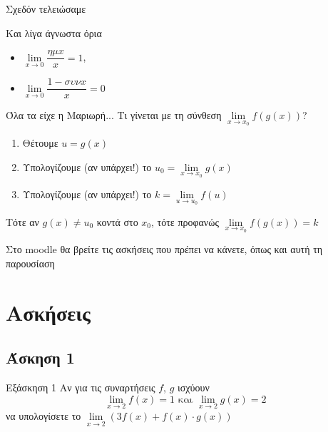 \documentclass[greek]{beamer}
\begin{document}
\begin{frame}{Σχεδόν τελειώσαμε}
  \begin{block}{Και λίγα άγνωστα όρια}
    \begin{itemize}
      \item $\lim\limits_{x \to 0}{ \dfrac{ημx}{x} }=1$, \pause
      \item $\lim\limits_{x \to 0}{ \dfrac{1-συνx}{x} }=0$
    \end{itemize}
  \end{block}
\end{frame}

\begin{frame}{Όλα τα είχε η Μαριωρή...}
  Τι γίνεται με τη σύνθεση  $\lim\limits_{x \to x_0}{ f(g(x))}$?
  \begin{enumerate}
    \item<1-> Θέτουμε $u=g(x)$
    \item<2-> Υπολογίζουμε (αν υπάρχει!) το $u_0=\lim\limits_{x \to x_0}{ g(x)}$
    \item<3-> Υπολογίζουμε (αν υπάρχει!) το $k=\lim\limits_{u \to u_0}{ f(u)}$
  \end{enumerate}
  Τότε αν $g(x)\ne u_0$ κοντά στο $x_0$, τότε προφανώς $\lim\limits_{x \to x_0}{ f(g(x))}=k$
\end{frame}

\begin{frame}
  Στο moodle θα βρείτε τις ασκήσεις που πρέπει να κάνετε, όπως και αυτή τη παρουσίαση
\end{frame}

\section{Ασκήσεις}

\subsection{Άσκηση 1}
\begin{frame}[label=Άσκηση1,t]{Εξάσκηση 1}
  Αν για τις συναρτήσεις $f$, $g$ ισχύουν
  $$\lim\limits_{x \to 2}{ f(x) }=1 \text{ και } \lim\limits_{ x \to 2}{ g(x) }=2$$
  να υπολογίσετε το $\lim\limits_{x \to 2}{ (3f(x)+f(x)\cdot g(x)) }$

\end{frame}
\end{document}
